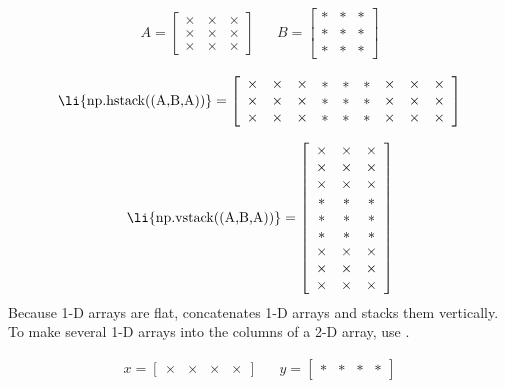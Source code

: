 \begin{align*}
A = \left[\begin{array}{ccc}
\times & \times & \times\\
\times & \times & \times\\
\times & \times & \times
\end{array}\right]
&&
B = \left[\begin{array}{ccc}
* & * & * \\
* & * & * \\
* & * & *
\end{array}\right]
\end{align*}

\begin{align*}
\text{\li{np.hstack((A,B,A))}} =
\left[\begin{array}{ccccccccc}
\times & \times & \times & * & * & * & \times & \times & \times\\
\times & \times & \times & * & * & * & \times & \times & \times\\
\times & \times & \times & * & * & * & \times & \times & \times
\end{array}\right]
\end{align*}

\begin{align*}
\text{\li{np.vstack((A,B,A))}} =
\left[\begin{array}{ccc}
\times & \times & \times\\
\times & \times & \times\\
\times & \times & \times\\
* & * & * \\
* & * & * \\
* & * & * \\
\times & \times & \times\\
\times & \times & \times\\
\times & \times & \times
\end{array}\right]
\end{align*}
Because 1-D arrays are flat,  concatenates 1-D arrays and  stacks them vertically.
To make several 1-D arrays into the columns of a 2-D array, use .

\begin{align*}
x = \left[\begin{array}{cccc}
\times & \times & \times & \times\end{array}\right]
&&
y = \left[\begin{array}{cccc}
* & * & * & *\end{array}\right]
\end{align*}

